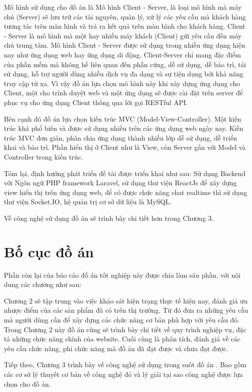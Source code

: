 \documentclass[../DoAn.tex]{subfiles}
\begin{document}
Mô hình sử dụng cho đồ án là Mô hình Client  - Server, là loại mô hình mà máy chủ (Server) sẽ lưu trữ các tài nguyên, quản lý,  xử lý các yêu cầu mà khách hàng tương tác trên màn hình và trả ra kết quả trên màn hình cho khách hàng. Client  - Server là mô hình mà một hay nhiều máy khách (Client) gửi yêu cầu đến máy chủ trung tâm. Mô hình Client - Server được sử dụng trong nhiều ứng dụng hiện nay như ứng dụng web hay ứng dụng di động. Client-Server chỉ mang đặc điểm của phần mềm mà không hề liên quan đến phần cứng, dễ sử dụng, dễ bảo trì, tái sử dụng, hỗ trợ người dùng nhiều dịch vụ đa dạng và sự tiện dụng bởi khả năng truy cập từ xa. Vì vậy đồ án lựa chọn mô hình này khi xây dựng ứng dụng cho Client, một cho trình duyệt web và một ứng dụng sẽ được cài đặt trên server để phục vụ cho ứng dụng Client thông qua lời gọi RESTful API. 

Bên cạnh đó đồ án lựa chọn kiến trúc MVC (Model-View-Controller). Một kiến trúc khá phổ biến và được sử dụng nhiều trên các ứng dụng web ngày nay. Kiến trúc MVC đơn giản, phân chia ứng dụng thành nhiều lớp dễ sử dụng, dễ triển khai và bảo trì. Phần hiển thị ở Client như là View, còn Server gắn với Model và Controller trong kiến trúc.

Tóm lại, định hướng phát triển đề tài được triển khai như sau: Sử dụng Backend với Ngôn ngữ PHP framework Laravel, sử dụng thư viện ReactJs để xây dựng view hiển thị trên ứng dụng web, để có được chức năng chat realtime thì sử dụng thư viện Socket.IO, hệ quản trị cơ sở dữ liệu là MySQL.

Về công nghệ sử dụng đồ án sẽ trình bày chi tiết hơn trong Chương 3.
\section{Bố cục đồ án}
\label{section:1.4}
Phần còn lại của báo cáo đồ án tốt nghiệp này được chia làm sáu phần, với nội dung các chương như sau: 

Chương 2 sẽ tập trung vào việc khảo sát hiện trạng thực tế hiện nay, đánh giá ưu nhược điểm của các sản phẩm đã có trên thị trường. Từ đó đưa ra những yêu cầu mà người dùng cần để xây dựng các chức năng cơ bản phù hợp với yêu cầu đó. Trong Chương 2 này đồ án cũng sẽ trình bày chi tiết về quy trình nghiệp vụ, đặc tả những chức năng chính của website. Cuối cùng là phân tích, đánh giá về các yêu cầu chức năng, phi chức năng mà đồ án đã đạt được và chưa đạt được.

Tiếp theo, Chương 3 trình bày về công nghệ sử dụng trong suốt đồ án . Bao gồm các cơ sở lý thuyết cơ bản về công nghệ đó và lý giải tại sao công nghệ được lựa chọn cho đồ án. 
\end{document}
